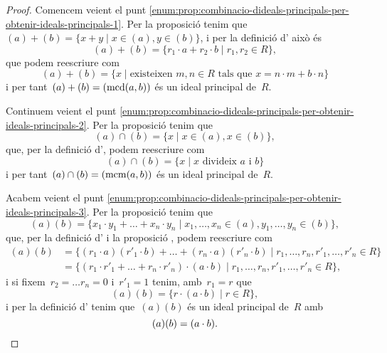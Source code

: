 \documentclass[../../main.tex]{subfiles}
\begin{document}
    \begin{proof}%
        Comencem veient el punt \eqref{enum:prop:combinacio-dideals-principals-per-obtenir-ideals-principals-1}.
        Per la proposició  tenim que~\((a)+(b)=\{x+y\mid x\in(a),y\in(b)\}\), i per la definició d' això és
        \[
            (a)+(b)=\{r_{1}\cdot a+r_{2}\cdot b\mid r_{1},r_{2}\in R\},
        \]
        que podem reescriure com
        \[
            (a)+(b)=\{x\mid\text{existeixen }m,n\in R\text{ tals que }x=n\cdot m+b\cdot n\}
        \]
        i per tant~\((a)+(b)=(\operatorname{mcd}(a,b))\) és un ideal principal de~\(R\).

        Continuem veient el punt \eqref{enum:prop:combinacio-dideals-principals-per-obtenir-ideals-principals-2}.
        Per la proposició  tenim que
        \[
            (a)\cap(b)=\{x\mid x\in(a),x\in(b)\},
        \]
        que, per la definició d', podem reescriure com
        \[
            (a)\cap(b)=\{x\mid x\text{ divideix }a\text{ i }b\}
        \]
        i per tant~\((a)\cap(b)=(\operatorname{mcm}(a,b))\) és un ideal principal de~\(R\).

        Acabem veient el punt \eqref{enum:prop:combinacio-dideals-principals-per-obtenir-ideals-principals-3}.
        Per la proposició  tenim que
        \[
            (a)(b)=\{x_{1}\cdot y_{1}+\dots+x_{n}\cdot y_{n}\mid x_{1},\dots,x_{n}\in(a),y_{1},\dots,y_{n}\in(b)\},
        \]
        que, per la definició d' i la proposició , podem reescriure com
        \begin{align*}
        (a)(b)&=\{(r_{1}\cdot a)(r'_{1}\cdot b)+\dots+(r_{n}\cdot a)(r'_{n}\cdot b)\mid r_{1},\dots,r_{n},r'_{1},\dots,r'_{n}\in R\}\\
        &=\{(r_{1}\cdot r'_{1}+\dots+r_{n}\cdot r'_{n})\cdot(a\cdot b)\mid r_{1},\dots,r_{n},r'_{1},\dots,r'_{n}\in R\},
        \end{align*}
        i si fixem~\(r_{2}=\dots r_{n}=0\) i~\(r'_{1}=1\) tenim, amb~\(r_{1}=r\) que
        \[
            (a)(b)=\{r\cdot(a\cdot b)\mid r\in R\},
        \]
        i per la definició d' tenim que~\((a)(b)\) és un ideal principal de~\(R\) amb
        \[
            (a)(b)=(a\cdot b).\qedhere
        \]
    \end{proof}
\end{document}
